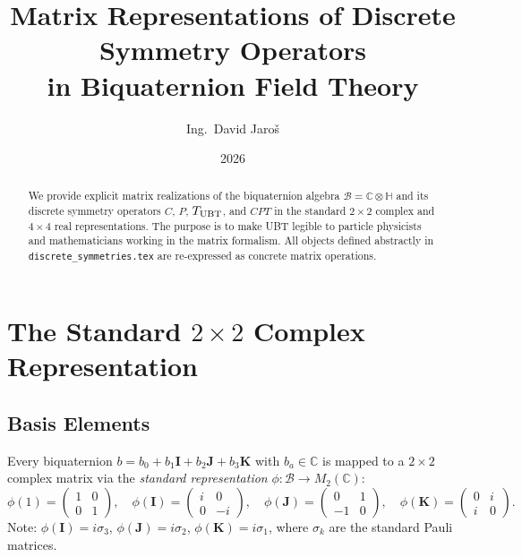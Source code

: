 \documentclass[12pt,a4paper]{article}
\title{\textbf{Matrix Representations of Discrete Symmetry Operators\\
                 in Biquaternion Field Theory}}
\author{Ing.\ David Jaro\v{s}}
\date{2026}
\theoremstyle{definition}
\theoremstyle{remark}
\begin{document}
  \maketitle

  \begin{abstract}
  We provide explicit matrix realizations of the biquaternion algebra
  $\mathcal{B}=\mathbb{C}\otimes\mathbb{H}$ and its discrete symmetry operators
  $C$, $P$, $T_{\rm UBT}$, and $CPT$ in the standard $2\times2$ complex and
  $4\times4$ real representations.
  The purpose is to make UBT legible to particle physicists and mathematicians
  working in the matrix formalism.
  All objects defined abstractly in \texttt{discrete\_symmetries.tex} are
  re-expressed as concrete matrix operations.
  \end{abstract}
\fi

\section{The Standard $2\times2$ Complex Representation}
\label{sec:mat:2x2}

\subsection{Basis Elements}

Every biquaternion $b = b_0 + b_1\mathbf{I} + b_2\mathbf{J} + b_3\mathbf{K}$
with $b_a\in\mathbb{C}$ is mapped to a $2\times2$ complex matrix via the
\emph{standard representation} $\phi:\mathcal{B}\to M_2(\mathbb{C})$:
\begin{equation}
  \phi(1) = \begin{pmatrix} 1 & 0 \\ 0 & 1 \end{pmatrix},
  \quad
  \phi(\mathbf{I}) = \begin{pmatrix} i & 0 \\ 0 & -i \end{pmatrix},
  \quad
  \phi(\mathbf{J}) = \begin{pmatrix} 0 & 1 \\ -1 & 0 \end{pmatrix},
  \quad
  \phi(\mathbf{K}) = \begin{pmatrix} 0 & i \\ i & 0 \end{pmatrix}.
  \label{eq:mat:basis_2x2}
\end{equation}
Note: $\phi(\mathbf{I}) = i\sigma_3$, $\phi(\mathbf{J}) = i\sigma_2$,
$\phi(\mathbf{K}) = i\sigma_1$, where $\sigma_k$ are the standard Pauli matrices.
\end{document}
